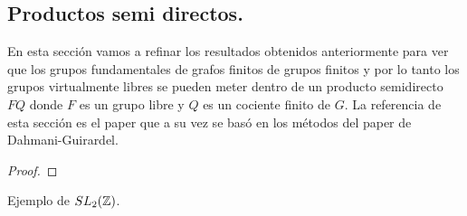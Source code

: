 \documentclass[tesis.tex]{subfiles}
\newcommand{\fg}{grupo finitamente generado }
\begin{document}
\subsection{Productos semi directos.}

En esta sección vamos a refinar los resultados obtenidos anteriormente para ver que los grupos fundamentales de grafos finitos de grupos finitos y por lo tanto los grupos virtualmente libres se pueden meter dentro de un producto semidirecto $F Q$ donde $F$ es un grupo libre y $Q$ es un cociente finito de $G$.
La referencia de esta sección es el paper \cite{} que a su vez se basó en los métodos del paper de Dahmani-Guirardel.

\begin{prop}
	
\end{prop}
\begin{proof}
\end{proof}

\begin{ej}
	Ejemplo de $SL_2(\mathbb{Z})$.
\end{ej}
%
%
%
%
%
%
%
%
%	
%
%
%
%
\end{document}
